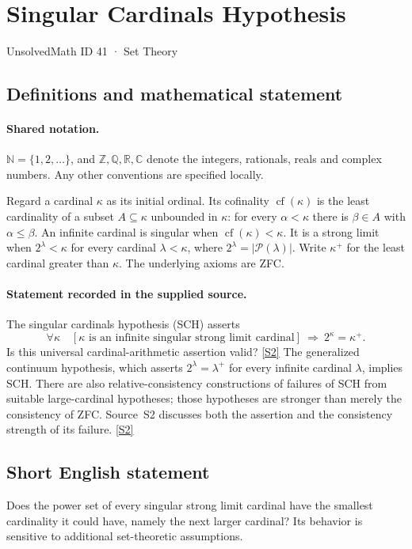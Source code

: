 \documentclass[11pt]{article}
\newcommand{\sref}[2]{\hyperlink{source:#1:#2}{[S#2]}}
\begin{document}
\setcounter{section}{40}
\section{Singular Cardinals Hypothesis}\label{41}
{\small\sffamily UnsolvedMath ID 41 · Set Theory}
\subsection{Definitions and mathematical statement}

\paragraph{Shared notation.}$\mathbb N=\{1,2,\ldots\}$, and $\mathbb Z,\mathbb Q,\mathbb R,\mathbb C$ denote the integers, rationals, reals and complex numbers. Any other conventions are specified locally.


Regard a cardinal $\kappa$ as its initial ordinal. Its cofinality $\operatorname{cf}(\kappa)$ is the least cardinality of a subset $A\subseteq\kappa$ unbounded in $\kappa$: for every $\alpha<\kappa$ there is $\beta\in A$ with $\alpha\le\beta$. An infinite cardinal is singular when $\operatorname{cf}(\kappa)<\kappa$. It is a strong limit when $2^\lambda<\kappa$ for every cardinal $\lambda<\kappa$, where $2^\lambda=|\mathcal P(\lambda)|$. Write $\kappa^+$ for the least cardinal greater than $\kappa$. The underlying axioms are ZFC.
\paragraph{Statement recorded in the supplied source.}
The singular cardinals hypothesis (SCH) asserts
\[
 \forall\kappa\quad
 [\kappa\text{ is an infinite singular strong limit cardinal}]
 \ \Longrightarrow\ 2^\kappa=\kappa^+.
\]
Is this universal cardinal-arithmetic assertion valid? \sref{41}{2}
The generalized continuum hypothesis, which asserts $2^\lambda=\lambda^+$ for every infinite cardinal $\lambda$, implies SCH. There are also relative-consistency constructions of failures of SCH from suitable large-cardinal hypotheses; those hypotheses are stronger than merely the consistency of ZFC. Source~S2 discusses both the assertion and the consistency strength of its failure. \sref{41}{2}
\subsection{Short English statement}
Does the power set of every singular strong limit cardinal have the smallest cardinality it could have, namely the next larger cardinal? Its behavior is sensitive to additional set-theoretic assumptions.
\end{document}
